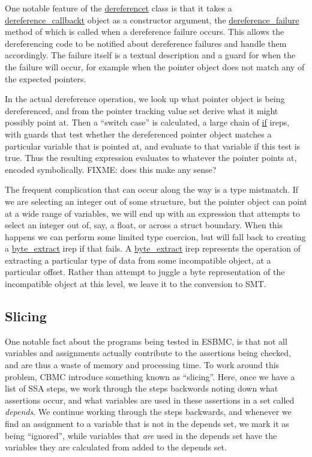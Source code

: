 \documentclass{article}
\begin{document}
One notable feature of the \url{dereferencet} class is that it takes a
\url{dereference_callbackt} object as a constructor argument, the
\url{dereference_failure} method of which is called when a dereference
failure occurs. This allows the dereferencing code to be notified about
dereference failures and handle them accordingly. The failure itself
is a textual description and a guard for when the the failure will occur,
for example when the pointer object does not match any of the expected
pointers.

In the actual dereference operation, we look up what pointer object is being
dereferenced, and from the pointer tracking value set derive what it might
possibly point at. Then a ``switch case'' is calculated, a large chain of
\url{if} ireps, with guards that test whether the dereferenced pointer object
matches a particular variable that is pointed at, and evaluate to that variable
if this test is true. Thus the resulting expression evaluates to whatever
the pointer points at, encoded symbolically. FIXME: does this make any sense?

The frequent complication that can occur along the way is a type mistmatch.
If we are selecting an integer out of some structure, but the pointer object
can point at a wide range of variables, we will end up with an expression
that attempts to select an integer out of, say, a float, or across a struct
boundary. When this happens we can perform some limited type coercion, but
will fall back to creating a \url{byte_extract} irep if that fails. A
\url{byte_extract} irep represents the operation of extracting a particular
type of data from some incompatible object, at a particular offset. Rather than
attempt to juggle a byte representation of the incompatible object at this
level, we leave it to the conversion to SMT.

\subsection{Slicing}

One notable fact about the programs being tested in ESBMC, is that not all
variables and assignments actually contribute to the assertions being checked,
and are thus a waste of memory and processing time. To work around this problem,
CBMC introduce something known as ``slicing''. Here, once we have a list of
SSA steps, we work through the steps backwords noting down what assertions
occur, and what variables are used in these assertions in a set called
\textit{depends}. We continue working through the steps backwards, and whenever
we find an assignment to a variable that is not in the depends set,
we mark it as being ``ignored'', while variables that \textit{are} used in the
depends set have the variables they are calculated from added to the depends
set.
\end{document}
